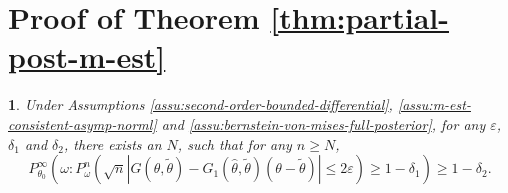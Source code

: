 \documentclass[oneside,english]{amsbook}
\numberwithin{section}{chapter}
\numberwithin{equation}{section}
\numberwithin{figure}{section}
\theoremstyle{plain}
\newtheorem{lem}{\protect\lemmaname}
\theoremstyle{plain}
\theoremstyle{definition}
\theoremstyle{plain}
\theoremstyle{plain}
\theoremstyle{remark}
\theoremstyle{definition}
\theoremstyle{definition}
\providecommand{\lemmaname}{Lemma}
\begin{document}
\section{\label{sec:Proof-of-Theorem-2}Proof of Theorem \ref{thm:partial-post-m-est}}
\begin{lem}
\label{lem:taylor-expansion-in-dist}Under Assumptions \ref{assu:second-order-bounded-differential},
\ref{assu:m-est-consistent-asymp-norml} and \ref{assu:bernstein-von-mises-full-posterior},
for any $\varepsilon$, $\delta_{1}$ and $\delta_{2}$, there exists
an $N$, such that for any $n\ge N$, 
\[
P_{\theta_{0}}^{\infty}\left(\omega:P_{\omega}^{n}\left(\sqrt{n}\left|G\left(\theta,\tilde{\theta}\right)-G_{1}\left(\hat{\theta},\tilde{\theta}\right)\left(\theta-\tilde{\theta}\right)\right|\le2\varepsilon\right)\ge1-\delta_{1}\right)\ge1-\delta_{2}.
\]
\end{lem}
\end{document}
